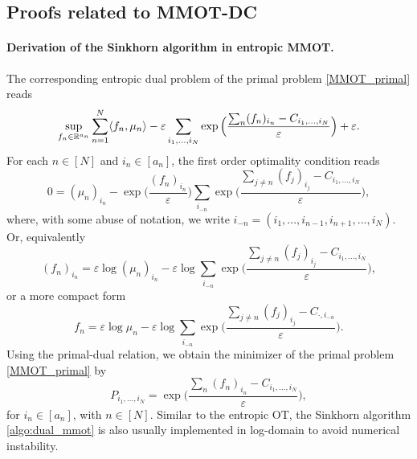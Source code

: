 
\subsection{Proofs related to MMOT-DC} \label{appendix:subsec_mmot_dc}

\paragraph{Derivation of the Sinkhorn algorithm in entropic MMOT.} The corresponding entropic dual problem of the primal problem
\eqref{MMOT_primal} reads
\begin{equation}
  \sup_{f_n \in \mathbb R^{a_n}} \sum_{n=1}^N \langle f_n, \mu_n \rangle -
  \varepsilon \sum_{i_1,...,i_N} \exp\Big( \frac{\sum_n (f_n)_{i_n} - C_{i_1,...,i_N}}{\varepsilon} \Big) + \varepsilon.
\end{equation}
For each $n \in [N]$ and $i_n \in [a_n]$, the first order optimality condition reads
\begin{equation}
  0 = (\mu_n)_{i_n} - \exp\big( \frac{(f_n)_{i_n}}{\varepsilon} \big)
  \sum_{i_{-n}} \exp\Big( \frac{\sum_{j \neq n} (f_j)_{i_j} - C_{i_1,...,i_N}}{\varepsilon} \Big),
\end{equation}
where, with some abuse of notation, we write $i_{-n} = (i_1, ..., i_{n-1}, i_{n+1}, ..., i_N)$. Or, equivalently
\begin{equation}
  (f_n)_{i_n} = \varepsilon \log (\mu_n)_{i_n} - \varepsilon \log \sum_{i_{-n}}
  \exp\Big( \frac{\sum_{j \neq n} (f_j)_{i_j} - C_{i_1,...,i_N}}{\varepsilon} \Big),
\end{equation}
or a more compact form
\begin{equation}
  f_n = \varepsilon \log \mu_n - \varepsilon \log \sum_{i_{-n}}
  \exp\Big( \frac{\sum_{j \neq n} (f_j)_{i_j} - C_{\cdot, i_{-n}}}{\varepsilon} \Big).
\end{equation}
Using the primal-dual relation, we obtain the minimizer of the primal problem \eqref{MMOT_primal} by
\begin{equation}
  P_{i_1,...,i_N} = \exp\Big( \frac{\sum_n (f_n)_{i_n} - C_{i_1,...,i_N}}{\varepsilon} \Big),
\end{equation}
for $i_n \in [a_n]$, with $n \in [N]$. Similar to the entropic OT,
the Sinkhorn algorithm \ref{algo:dual_mmot} is also usually implemented in log-domain
to avoid numerical instability.
